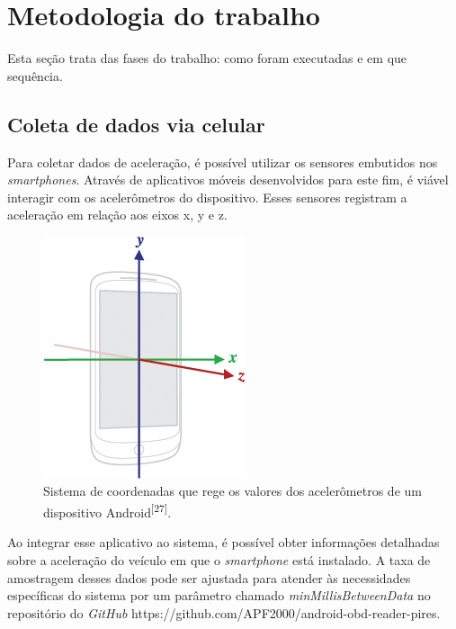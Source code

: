 \chapter{Metodologia do trabalho}
\label{CAP3}

Esta seção trata das fases do trabalho: como foram  executadas e em que sequência.



\section{Coleta de dados via celular}
Para coletar dados de aceleração, é possível utilizar os sensores embutidos nos \textit{smartphones}. Através de aplicativos móveis desenvolvidos para este fim, é viável interagir com os acelerômetros do dispositivo. Esses sensores registram a aceleração em relação aos eixos x, y e z. 


\begin{figure}[hp]
    \centering
    
    \includegraphics[]{figures/axis_android_device.png}
    
    \caption{Sistema de coordenadas que rege os valores dos acelerômetros de um dispositivo Android\textsuperscript{[27]}.}
    
    \label{fig:axis_android}
\end{figure}

Ao integrar esse aplicativo ao sistema, é possível obter informações detalhadas sobre a aceleração do veículo em que o \textit{smartphone} está instalado. A taxa de amostragem desses dados pode ser ajustada para atender às necessidades específicas do sistema por um parâmetro chamado \textit{minMillisBetweenData} no repositório do \textit{GitHub} https://github.com/APF2000/android-obd-reader-pires. 

